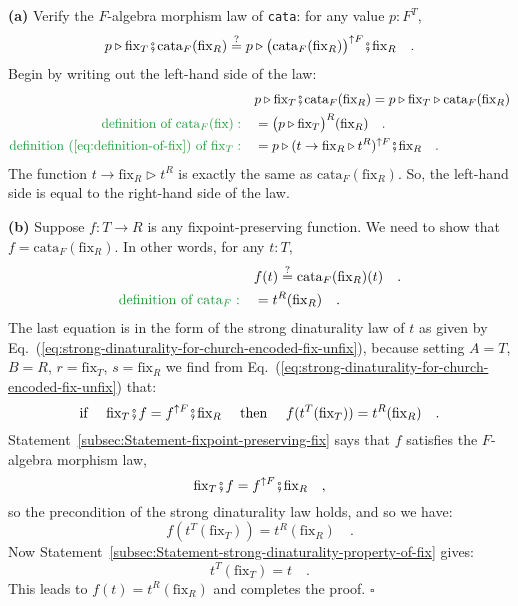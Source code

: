 \textbf{(a)} Verify the $F$-algebra morphism law of \lstinline!cata!:
for any value $p:F^{T}$,
\[
p\triangleright\text{fix}_{T}\bef\text{cata}_{F}(\text{fix}_{R})\overset{?}{=}p\triangleright\big(\text{cata}_{F}(\text{fix}_{R})\big)^{\uparrow F}\bef\text{fix}_{R}\quad.
\]
Begin by writing out the left-hand side of the law:
\begin{align*}
 & p\triangleright\text{fix}_{T}\bef\text{cata}_{F}(\text{fix}_{R})=p\triangleright\text{fix}_{T}\triangleright\text{cata}_{F}(\text{fix}_{R})\\
{\color{greenunder}\text{definition of }\text{cata}_{F}(\text{fix}):}\quad & =\big(p\triangleright\text{fix}_{T}\big)^{R}(\text{fix}_{R})\quad.\\
{\color{greenunder}\text{definition (\ref{eq:definition-of-fix}) of }\text{fix}_{T}:}\quad & =p\triangleright(t\rightarrow\text{fix}_{R}\triangleright t^{R})^{\uparrow F}\bef\text{fix}_{R}\quad.
\end{align*}
The function $t\rightarrow\text{fix}_{R}\triangleright t^{R}$ is
exactly the same as $\text{cata}_{F}(\text{fix}_{R})$. So, the left-hand
side is equal to the right-hand side of the law.

\textbf{(b)} Suppose $f:T\rightarrow R$ is any fixpoint-preserving
function. We need to show that $f=\text{cata}_{F}(\text{fix}_{R})$.
In other words, for any $t:T$, 
\begin{align*}
 & f(t)\overset{?}{=}\text{cata}_{F}(\text{fix}_{R})(t)\quad.\\
{\color{greenunder}\text{definition of }\text{cata}_{F}:}\quad & =t^{R}(\text{fix}_{R})\quad.
\end{align*}
The last equation is in the form of the strong dinaturality law of
$t$ as given by Eq.~(\ref{eq:strong-dinaturality-for-church-encoded-fix-unfix}),
because setting $A=T$, $B=R$, $r=\text{fix}_{T}$, $s=\text{fix}_{R}$
we find from Eq.~(\ref{eq:strong-dinaturality-for-church-encoded-fix-unfix})
that:
\[
\text{if }\quad\text{fix}_{T}\bef f=f^{\uparrow F}\bef\text{fix}_{R}\quad\text{ then }\quad f(t^{T}(\text{fix}_{T}))=t^{R}(\text{fix}_{R})\quad.
\]
Statement~\ref{subsec:Statement-fixpoint-preserving-fix} says that
$f$ satisfies the $F$-algebra morphism law,
\[
\text{fix}_{T}\bef f=f^{\uparrow F}\bef\text{fix}_{R}\quad,
\]
so the precondition of the strong dinaturality law holds, and so we
have:
\[
f(t^{T}(\text{fix}_{T}))=t^{R}(\text{fix}_{R})\quad.
\]
Now Statement~\ref{subsec:Statement-strong-dinaturality-property-of-fix}
gives:
\[
t^{T}(\text{fix}_{T})=t\quad.
\]
This leads to $f(t)=t^{R}(\text{fix}_{R})$ and completes the proof.
$\square$

